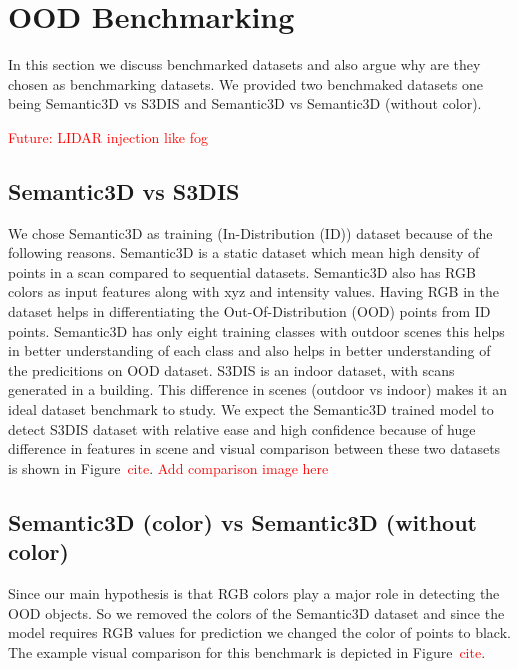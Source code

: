 \section{OOD Benchmarking}
In this section we discuss benchmarked datasets and also argue why are they chosen as benchmarking datasets.
We provided two benchmaked datasets one being Semantic3D vs S3DIS and Semantic3D vs Semantic3D (without color).

\textcolor{red}{Future: LIDAR injection like fog}
\subsection{Semantic3D vs S3DIS}
We chose Semantic3D as training (In-Distribution (ID)) dataset because of the following reasons.
Semantic3D is a static dataset which mean high density of points in a scan compared to sequential datasets.
Semantic3D also has RGB colors as input features along with xyz and intensity values.
Having RGB in the dataset helps in differentiating the Out-Of-Distribution (OOD) points from ID points.
Semantic3D has only eight training classes with outdoor scenes this helps in better understanding of each class and also helps in better understanding of the predicitions on OOD dataset.
S3DIS is an indoor dataset, with scans generated in a building.
This difference in scenes (outdoor vs indoor) makes it an ideal dataset benchmark to study.
We expect the Semantic3D trained model to detect S3DIS dataset with relative ease and high confidence because of huge difference in features in scene and visual comparison between these two datasets is shown in Figure~\textcolor{red}{cite}.
\textcolor{red}{Add comparison image here}

\subsection{Semantic3D (color) vs Semantic3D (without color)}
Since our main hypothesis is that RGB colors play a major role in detecting the OOD objects.
So we removed the colors of the Semantic3D dataset and since the model requires RGB values for prediction we changed the color of points to black.
The example visual comparison for this benchmark is depicted in Figure~\textcolor{red}{cite}.
